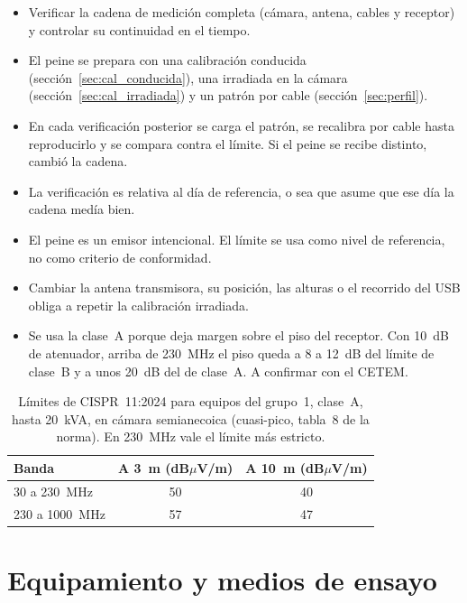 \documentclass[11pt,a4paper]{article}
\begin{document}
\begin{itemize}
  \item Verificar la cadena de medición completa (cámara, antena, cables y receptor) y controlar su continuidad en el tiempo.
  \item El peine se prepara con una calibración conducida (sección~\ref{sec:cal_conducida}), una irradiada en la cámara (sección~\ref{sec:cal_irradiada}) y un patrón por cable (sección~\ref{sec:perfil}).
  \item En cada verificación posterior se carga el patrón, se recalibra por cable hasta reproducirlo y se compara contra el límite. Si el peine se recibe distinto, cambió la cadena.
  \item La verificación es relativa al día de referencia, o sea que asume que ese día la cadena medía bien.
  \item El peine es un emisor intencional. El límite se usa como nivel de referencia, no como criterio de conformidad.
  \item Cambiar la antena transmisora, su posición, las alturas o el recorrido del USB obliga a repetir la calibración irradiada.
  \item Se usa la clase~A porque deja margen sobre el piso del receptor. Con 10~dB de atenuador, arriba de 230~MHz el piso queda a 8 a 12~dB del límite de clase~B y a unos 20~dB del de clase~A. A confirmar con el CETEM.
\end{itemize}

\begin{table}[H]
  \centering
  \begin{tabular}{@{}lcc@{}}
    \toprule
    Banda & A 3~m (dB$\mu$V/m) & A 10~m (dB$\mu$V/m) \\
    \midrule
    30 a 230~MHz   & 50 & 40 \\
    230 a 1000~MHz & 57 & 47 \\
    \bottomrule
  \end{tabular}
  \caption{Límites de CISPR~11:2024 para equipos del grupo~1, clase~A, hasta 20~kVA, en cámara semianecoica (cuasi-pico, tabla~8 de la norma). En 230~MHz vale el límite más estricto.}
  \label{tab:limites}
\end{table}

\section{Equipamiento y medios de ensayo}
\end{document}
